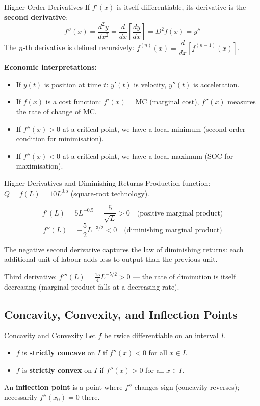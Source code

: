 \documentclass[12pt, a4paper]{article}
\theoremstyle{definition}
\newcommand{\ddd}[2]{\dfrac{d#1}{d#2}}
\newcommand{\dddd}[2]{\dfrac{d^{2}#1}{d#2^{2}}}
\begin{document}
\begin{defbox}{Higher-Order Derivatives}
If $f'(x)$ is itself differentiable, its derivative is the
\textbf{second derivative}:
\[
  f''(x) = \dddd{y}{x} = \ddd{}{x}\!\left[\ddd{y}{x}\right]
         = D^2 f(x) = y''
\]
The $n$-th derivative is defined recursively:
$f^{(n)}(x) = \ddd{}{x}[f^{(n-1)}(x)]$.
\end{defbox}

\textbf{Economic interpretations:}
\begin{itemize}
  \item If $y(t)$ is position at time $t$: $y'(t)$ is velocity,
    $y''(t)$ is acceleration.
  \item If $f(x)$ is a cost function: $f'(x) = \text{MC}$ (marginal cost),
    $f''(x)$ measures the rate of change of MC.
  \item If $f''(x) > 0$ at a critical point, we have a local minimum
    (second-order condition for minimisation).
  \item If $f''(x) < 0$ at a critical point, we have a local maximum
    (SOC for maximisation).
\end{itemize}

\begin{exbox}{Higher Derivatives and Diminishing Returns}
Production function: $Q = f(L) = 10L^{0.5}$ (square-root technology).

\[
  f'(L) = 5L^{-0.5} = \frac{5}{\sqrt{L}} > 0
  \quad\text{(positive marginal product)}
\]
\[
  f''(L) = -\frac{5}{2}L^{-3/2} < 0
  \quad\text{(diminishing marginal product)}
\]

The negative second derivative captures the law of diminishing returns:
each additional unit of labour adds less to output than the previous unit.

Third derivative: $f'''(L) = \frac{15}{4}L^{-5/2} > 0$ --- the rate of
diminution is itself decreasing (marginal product falls at a decreasing rate).
\end{exbox}

\subsection{Concavity, Convexity, and Inflection Points}

\begin{defbox}{Concavity and Convexity}
Let $f$ be twice differentiable on an interval $I$.
\begin{itemize}
  \item $f$ is \textbf{strictly concave} on $I$ if $f''(x) < 0$ for all $x \in I$.
  \item $f$ is \textbf{strictly convex} on $I$ if $f''(x) > 0$ for all $x \in I$.
\end{itemize}
An \textbf{inflection point} is a point where $f''$ changes sign
(concavity reverses); necessarily $f''(x_0) = 0$ there.
\end{defbox}
\end{document}

